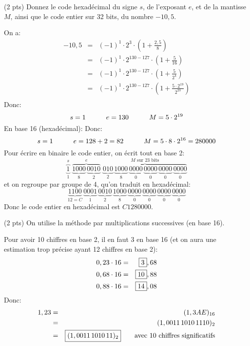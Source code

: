 \question (2 pts) Donnez le code hexadécimal du signe \(s\), de l'exposant \(e\), et de la mantisse \(M\), ainsi que le code entier sur 32 bits, du nombre \(-10,5\).

\begin{solution}
  On a:
  \begin{eqnarray*}
    -10,5&=&(-1)^1\cdot 2^3\cdot (1 + \frac{2,5}{8})\\
         &=& (-1)^1\cdot 2^{130-127}\cdot (1 + \frac{5}{16})\\
         &=& (-1)^1\cdot 2^{130-127}\cdot (1 + \frac{5}{2^4})\\
         &=& (-1)^1\cdot 2^{130-127}\cdot (1 + \frac{5\cdot 2^{19}}{2^{23}})\\
  \end{eqnarray*}
  Donc:
  \[
    s = 1 \hspace*{3em}e=130\hspace*{3em}M=5\cdot 2^{19}
  \]
  En base 16 (hexadécimal):
  Donc:
  \[
    s = 1 \hspace*{3em}e=128+2=82\hspace*{3em}M=5\cdot 8\cdot 2^{16}=280000
  \]
  Pour écrire en binaire le code entier, on écrit tout en base 2:
  \[
    \overbrace{\underbrace{1}_1}^s\,\,
    \overbrace{\underbrace{1000}_8\,\underbrace{0010}_2}^e\,\,
    \overbrace{\underbrace{010}_2\,\underbrace{1000}_8\,\underbrace{0000}_0\,\underbrace{0000}_0\,\underbrace{0000}_0\,\underbrace{0000}_0}^{M\text{ sur 23 bits}}
  \]
  et on regroupe par groupe de 4, qu'on traduit en hexadécimal:
  \[
    \underbrace{1100}_{12=C}\,\underbrace{0001}_1\,\underbrace{0010}_2\,\underbrace{1000}_8\,\underbrace{0000}_0\,\underbrace{0000}_0\,\underbrace{0000}_0\,\underbrace{0000}_0
  \]
  Donc le code entier en hexadécimal est \(C1280000\).
\end{solution}
\question (2 pts) On utilise la méthode par multiplications
successives (en base 16). 


\begin{solution}
  Pour avoir 10 chiffres en base 2, il en faut 3 en base 16 (et on
  aura une estimation trop précise ayant 12 chiffres en base 2):
  \begin{eqnarray*}
    0,23 \cdot 16 &=& \fbox{3},68\\
    0,68\cdot 16 &=& \fbox{10},88\\
    0,88\cdot 16 &=& \fbox{14},08\\
  \end{eqnarray*}
  Donc:
  \begin{eqnarray*}
    1,23 &=& (1,3AE)_{16}\\
    &=&(1,0011\,1010\,1110)_2\\
    &=&\fbox{\((1,0011\,1010\,11)_2\)}\hspace*{2em}\text{avec 10 chiffres significatifs}\\
  \end{eqnarray*}
  
\end{solution}

